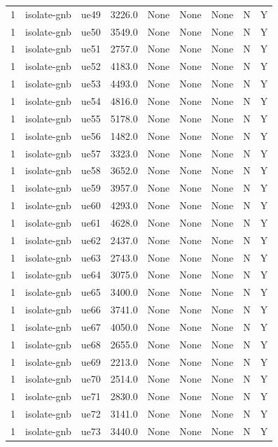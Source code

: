 \begin{table}[ht]
\begin{tabular}{|c|c|c|c|c|c|c|c|c|}
1 & isolate-gnb & ue49 & 3226.0 & None & None & None & N & Y \\
1 & isolate-gnb & ue50 & 3549.0 & None & None & None & N & Y \\
1 & isolate-gnb & ue51 & 2757.0 & None & None & None & N & Y \\
1 & isolate-gnb & ue52 & 4183.0 & None & None & None & N & Y \\
1 & isolate-gnb & ue53 & 4493.0 & None & None & None & N & Y \\
1 & isolate-gnb & ue54 & 4816.0 & None & None & None & N & Y \\
1 & isolate-gnb & ue55 & 5178.0 & None & None & None & N & Y \\
1 & isolate-gnb & ue56 & 1482.0 & None & None & None & N & Y \\
1 & isolate-gnb & ue57 & 3323.0 & None & None & None & N & Y \\
1 & isolate-gnb & ue58 & 3652.0 & None & None & None & N & Y \\
1 & isolate-gnb & ue59 & 3957.0 & None & None & None & N & Y \\
1 & isolate-gnb & ue60 & 4293.0 & None & None & None & N & Y \\
1 & isolate-gnb & ue61 & 4628.0 & None & None & None & N & Y \\
1 & isolate-gnb & ue62 & 2437.0 & None & None & None & N & Y \\
1 & isolate-gnb & ue63 & 2743.0 & None & None & None & N & Y \\
1 & isolate-gnb & ue64 & 3075.0 & None & None & None & N & Y \\
1 & isolate-gnb & ue65 & 3400.0 & None & None & None & N & Y \\
1 & isolate-gnb & ue66 & 3741.0 & None & None & None & N & Y \\
1 & isolate-gnb & ue67 & 4050.0 & None & None & None & N & Y \\
1 & isolate-gnb & ue68 & 2655.0 & None & None & None & N & Y \\
1 & isolate-gnb & ue69 & 2213.0 & None & None & None & N & Y \\
1 & isolate-gnb & ue70 & 2514.0 & None & None & None & N & Y \\
1 & isolate-gnb & ue71 & 2830.0 & None & None & None & N & Y \\
1 & isolate-gnb & ue72 & 3141.0 & None & None & None & N & Y \\
1 & isolate-gnb & ue73 & 3440.0 & None & None & None & N & Y \\

\end{tabular}
\end{table}

